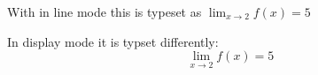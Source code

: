 \documentclass{article}
\begin{document}
With in line mode this is typeset as $\lim_{x \to 2} f(x) = 5$

\medskip
In display mode it is typset differently:
\[ \lim_{x \to 2} f(x) = 5 \]
\end{document}
